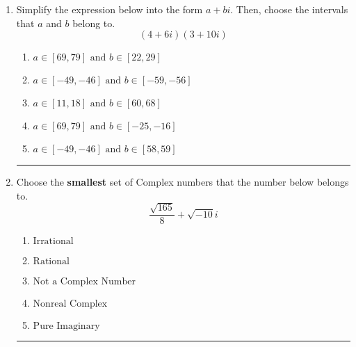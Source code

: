 \documentclass[14pt]{extbook}
\newcommand{\litem}[1]{\item#1\hspace*{-1cm}\rule{\textwidth}{0.4pt}}
\begin{document}
\begin{enumerate}
{\begin{enumerate}[label=\Alph*.]
\end{enumerate} }
\litem{
Simplify the expression below into the form $a+bi$. Then, choose the intervals that $a$ and $b$ belong to.\[ (4 + 6 i)(3 + 10 i) \]\begin{enumerate}[label=\Alph*.]
\item \( a \in [69, 79] \text{ and } b \in [22, 29] \)
\item \( a \in [-49, -46] \text{ and } b \in [-59, -56] \)
\item \( a \in [11, 18] \text{ and } b \in [60, 68] \)
\item \( a \in [69, 79] \text{ and } b \in [-25, -16] \)
\item \( a \in [-49, -46] \text{ and } b \in [58, 59] \)

\end{enumerate} }
\litem{
Choose the \textbf{smallest} set of Complex numbers that the number below belongs to.\[ \frac{\sqrt{165}}{8}+\sqrt{-10}i \]\begin{enumerate}[label=\Alph*.]
\item \( \text{Irrational} \)
\item \( \text{Rational} \)
\item \( \text{Not a Complex Number} \)
\item \( \text{Nonreal Complex} \)
\item \( \text{Pure Imaginary} \)

\end{enumerate} }
\end{enumerate}
\end{document}

